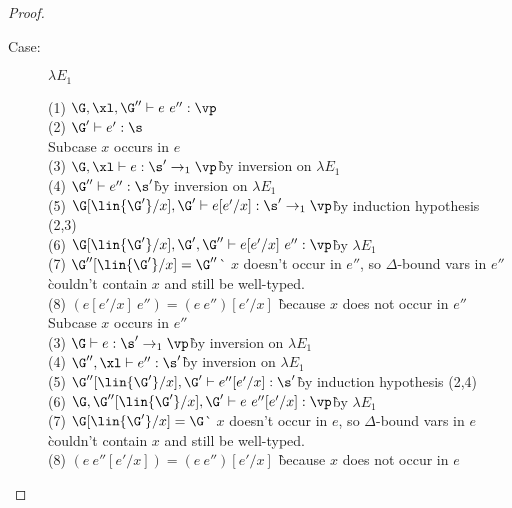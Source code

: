 \begin{proof}
\begin{description}
\begin{tabbing}
\end{tabbing}

\item[Case:] $\lambda E_1$
\begin{tabbing}
  (1) $\G, \xl, \G'' \vdash e~e'' : \vp$\\
  (2) $\G' \vdash e' : \s$\\
  Subcase $x$ occurs in $e$\\
  (3) $\G, \xl \vdash e : \s' \to_1 \vp$\` by inversion on $\lambda E_1$\\
  (4) $\G'' \vdash e'' : \s'$\` by inversion on $\lambda E_1$\\
  (5) $\G[\lin{\G'}/x], \G' \vdash e[e'/x] : \s' \to_1 \vp$\` by induction hypothesis (2,3)\\
  (6) $\G[\lin{\G'}/x], \G', \G'' \vdash e[e'/x]~e'' : \vp$\` by $\lambda E_1$\\
  (7) $\G''[\lin{\G'}/x] = \G''$\` $x$ doesn't occur in $e''$, so $\Delta$-bound vars in $e''$ \\
      \` couldn't contain $x$ and still be well-typed.\\
  (8) $(e[e'/x]~e'') = (e~e'')[e'/x]$ \` because $x$ does not occur in $e''$\\
  Subcase $x$ occurs in $e''$\\
  (3) $\G \vdash e : \s' \to_1 \vp$\` by inversion on $\lambda E_1$\\
  (4) $\G'', \xl \vdash e'' : \s'$\` by inversion on $\lambda E_1$\\
  (5) $\G''[\lin{\G'}/x], \G' \vdash e''[e'/x] : \s'$\` by induction hypothesis (2,4)\\
  (6) $\G, \G''[\lin{\G'}/x], \G' \vdash e~e''[e'/x] : \vp$\` by $\lambda E_1$\\
  (7) $\G[\lin{\G'}/x] = \G$\` $x$ doesn't occur in $e$, so $\Delta$-bound vars in $e$ \\
      \` couldn't contain $x$ and still be well-typed.\\
  (8) $(e~e''[e'/x]) = (e~e'')[e'/x]$ \` because $x$ does not occur in $e$\\
\end{tabbing}


\end{description}
\end{proof}
